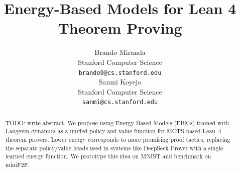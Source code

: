 \documentclass{article}
\title{Energy-Based Models for Lean 4 Theorem Proving}
\author{
  Brando Miranda \\
  Stanford Computer Science \\
  \texttt{brando9@cs.stanford.edu} \\
  \And
  Sanmi Koyejo \\
  Stanford Computer Science \\
  \texttt{sanmi@cs.stanford.edu} \\
}
\theoremstyle{plain}
\theoremstyle{definition}
\theoremstyle{remark}
\begin{document}
\maketitle

\begin{abstract}
TODO: write abstract.
We propose using Energy-Based Models (EBMs) trained with Langevin dynamics as a unified
policy and value function for MCTS-based Lean~4 theorem provers.
Lower energy corresponds to more promising proof tactics, replacing the separate
policy/value heads used in systems like DeepSeek-Prover with a single learned energy function.
We prototype this idea on MNIST and benchmark on miniF2F.
\end{abstract}










\appendix

\end{document}
